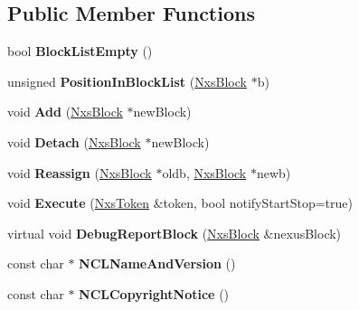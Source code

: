\subsection*{Public Member Functions}
\begin{DoxyCompactItemize}
\item 
\hypertarget{classNxsReader_a9a3140d103c5aba78f2abb92fe27b73a}{
bool {\bfseries BlockListEmpty} ()}
\label{classNxsReader_a9a3140d103c5aba78f2abb92fe27b73a}

\item 
\hypertarget{classNxsReader_ad8e1a7dcb1c13c88bd1bba769caff29f}{
unsigned {\bfseries PositionInBlockList} (\hyperlink{classNxsBlock}{NxsBlock} $\ast$b)}
\label{classNxsReader_ad8e1a7dcb1c13c88bd1bba769caff29f}

\item 
\hypertarget{classNxsReader_a6d8b9b4cbb59099097a529a4fe6abe39}{
void {\bfseries Add} (\hyperlink{classNxsBlock}{NxsBlock} $\ast$newBlock)}
\label{classNxsReader_a6d8b9b4cbb59099097a529a4fe6abe39}

\item 
\hypertarget{classNxsReader_aa40874a7359e61aef723430c171527e5}{
void {\bfseries Detach} (\hyperlink{classNxsBlock}{NxsBlock} $\ast$newBlock)}
\label{classNxsReader_aa40874a7359e61aef723430c171527e5}

\item 
\hypertarget{classNxsReader_a0a6e516ef15a8c44847a17dc63853fe4}{
void {\bfseries Reassign} (\hyperlink{classNxsBlock}{NxsBlock} $\ast$oldb, \hyperlink{classNxsBlock}{NxsBlock} $\ast$newb)}
\label{classNxsReader_a0a6e516ef15a8c44847a17dc63853fe4}

\item 
\hypertarget{classNxsReader_a57f6e706bac65d43bf5eb2bba3c58a0e}{
void {\bfseries Execute} (\hyperlink{classNxsToken}{NxsToken} \&token, bool notifyStartStop=true)}
\label{classNxsReader_a57f6e706bac65d43bf5eb2bba3c58a0e}

\item 
\hypertarget{classNxsReader_a6be16f40c9f3cbf0028c17dcee96d932}{
virtual void {\bfseries DebugReportBlock} (\hyperlink{classNxsBlock}{NxsBlock} \&nexusBlock)}
\label{classNxsReader_a6be16f40c9f3cbf0028c17dcee96d932}

\item 
\hypertarget{classNxsReader_a22c46391d31a39e4999812698cbcfa30}{
const char $\ast$ {\bfseries NCLNameAndVersion} ()}
\label{classNxsReader_a22c46391d31a39e4999812698cbcfa30}

\item 
\hypertarget{classNxsReader_a1d539ed1e250dcd8a22a7ea3ff9b0cbb}{
const char $\ast$ {\bfseries NCLCopyrightNotice} ()}
\label{classNxsReader_a1d539ed1e250dcd8a22a7ea3ff9b0cbb}


\end{DoxyCompactItemize}
